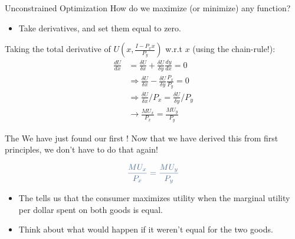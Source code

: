 \documentclass[12pt,t]{beamer}
\begin{document}
\begin{frame}{Unconstrained Optimization}
  How do we maximize (or minimize) any function? \pause
  \begin{itemize}
    \item Take derivatives, and set them equal to zero.
  \end{itemize}
  Taking the total derivative of $U(x,\frac{I - P_x x}{P_y})$ w.r.t $x$ (using the chain-rule!):
  \begin{align*}
    \frac{dU}{dx} & =\frac{\delta U}{\delta x} +\frac{\delta U}{\delta y}\frac{dy}{dx} = 0 \\
    &\Rightarrow \frac{\delta U}{\delta x} -\frac{\delta U}{\delta y}\frac{P_x}{P_y} =0 \\
    &\Rightarrow \frac{\delta U}{\delta x}/{P_x} = \frac{\delta U}{\delta y} /{P_y} \\
    &\rightarrow \frac{MU_x}{P_x} = \frac{MU_y} {P_y}
  \end{align*}
\end{frame}

\begin{frame}{The }
  We have just found our first ! Now that we have derived this from first principles, we don't have to do that again!

  $$
    \navy{\frac{MU_x}{P_x} = \frac{MU_y}{P_y}}
  $$

  \pause\bigskip
  \begin{itemize}
    \item The  tells us that the consumer maximizes utility when the marginal utility per dollar spent on both goods is equal.
    \item Think about what would happen if it weren't equal for the two goods.
  \end{itemize}
\end{frame}
\end{document}
